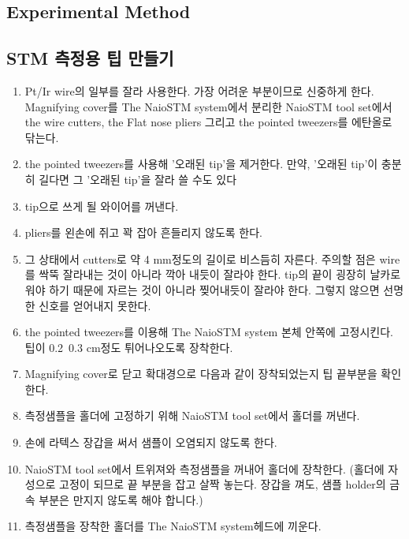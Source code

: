 \documentclass[a4paper, 10pt, nanum]{CSUniSchoolLabReport}
\begin{document}
\begin{enumerate}[label=\arabic*.]

\section{Experimental Method}

\subsection{STM 측정용 팁 만들기}
	\begin{enumerate}[label=\arabic*.]
		\item Pt/Ir wire의 일부를 잘라 사용한다. 가장 어려운 부분이므로 신중하게 한다.
		Magnifying cover를 The NaioSTM system에서 분리한 NaioSTM tool set에서 the wire cutters, the Flat nose pliers 그리고 the pointed tweezers를 에탄올로 닦는다.		
		\item the pointed tweezers를 사용해 '오래된 tip'을 제거한다. 만약, '오래된 tip'이 충분히 길다면 그 '오래된 tip'을 잘라 쓸 수도 있다
		\item tip으로 쓰게 될 와이어를 꺼낸다.
		\item pliers를 왼손에 쥐고 꽉 잡아 흔들리지 않도록 한다.
		\item 그 상태에서 cutters로 약 4 mm정도의 길이로 비스듬히 자른다. 주의할 점은 wire를 싹뚝 잘라내는 것이 아니라 깍아 내듯이 잘라야 한다. tip의 끝이 굉장히 날카로워야 하기 때문에 자르는 것이 아니라 찢어내듯이 잘라야 한다. 그렇지 않으면 선명한 신호를 얻어내지 못한다.
		\item the pointed tweezers를 이용해 The NaioSTM system 본체 안쪽에 고정시킨다. 팁이 0.2~0.3 cm정도 튀어나오도록 장착한다.
		\item Magnifying cover로 닫고 확대경으로 다음과 같이 장착되었는지 팁 끝부분을 확인한다.
		\item 측정샘플을 홀더에 고정하기 위해 NaioSTM tool set에서 홀더를 꺼낸다.
		\item 손에 라텍스 장갑을 써서 샘플이 오염되지 않도록 한다.
		\item NaioSTM tool set에서 트위져와 측정샘플을 꺼내어 홀더에 장착한다. (홀더에 자성으로 고정이 되므로 끝 부분을 잡고 살짝 놓는다.  장갑을 껴도, 샘플 holder의 금속 부분은 만지지 않도록 해야 합니다.)
		\item 측정샘플을 장착한 홀더를 The NaioSTM system헤드에 끼운다.
		\begin{figure}[htb!]

\end{figure}
\end{enumerate}
\end{enumerate}
\end{document}
